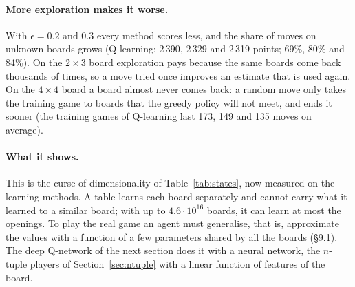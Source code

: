 \documentclass[11pt,a4paper]{article}
\theoremstyle{remark}
\begin{document}
\paragraph{More exploration makes it worse.} With $\epsilon=0.2$ and $0.3$ every method scores less, and the share of moves on unknown boards grows (Q-learning: 2\,390, 2\,329 and 2\,319 points; 69\%, 80\% and 84\%). On the $2\times3$ board exploration pays because the same boards come back thousands of times, so a move tried once improves an estimate that is used again. On the $4\times4$ board a board almost never comes back: a random move only takes the training game to boards that the greedy policy will not meet, and ends it sooner (the training games of Q-learning last 173, 149 and 135 moves on average).

\paragraph{What it shows.} This is the curse of dimensionality of Table~\ref{tab:states}, now measured on the learning methods. A table learns each board separately and cannot carry what it learned to a similar board; with up to $4.6\cdot10^{16}$ boards, it can learn at most the openings. To play the real game an agent must generalise, that is, approximate the values with a function of a few parameters shared by all the boards (\S9.1). The deep Q-network of the next section does it with a neural network, the $n$-tuple players of Section~\ref{sec:ntuple} with a linear function of features of the board.
\end{document}
